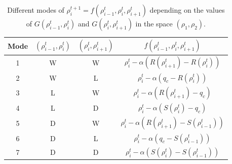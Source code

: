 \begin{table}[here]
\centering %
\begin{tabular}{c c c c} %
\hline\hline %
Mode & $(\rho^{t}_{i-1}, \rho^{t}_{i})$ & $(\rho^{t}_{i}, \rho^{t}_{i+1})$ & $f(\rho^{t}_{i-1},\rho^{t}_{i},\rho^{t}_{i+1})$ \\ [0.5ex]%
\hline %
1 & W & W & $\rho^{t}_{i} - \alpha(R(\rho^{t}_{i+1})-R(\rho^{t}_{i}))$ \\ [1ex]
2 & W & L & $\rho^{t}_{i} - \alpha(q_{c}-R(\rho^{t}_{i}))$ \\ [1ex]
3 & L & W & $\rho^{t}_{i} - \alpha(R(\rho^{t}_{i+1})-q_{c})$ \\ [1ex]
4 & L & D & $\rho^{t}_{i} - \alpha(S(\rho^{t}_{i})-q_{c})$ \\ [1ex]
5 & D & W & $\rho^{t}_{i} - \alpha(R(\rho^{t}_{i+1})-S(\rho^{t}_{i-1}))$ \\ [1ex]
6 & D & L & $\rho^{t}_{i} - \alpha(q_{c}-S(\rho^{t}_{i-1}))$ \\ [1ex]
7 & D & D & $\rho^{t}_{i} - \alpha(S(\rho^{t}_{i})-S(\rho^{t}_{i-1}))$ \\ [1ex]%
\hline %
\end{tabular}
\caption{Different modes of $\rho^{t+1}_{i} = f(\rho^{t}_{i-1},\rho^{t}_{i},\rho^{t}_{i+1})$ depending on the values of $G(\rho^{t}_{i-1},\rho^{t}_{i})$ and $G(\rho^{t}_{i},\rho^{t}_{i+1})$ in the space $(\rho_{1},\rho_{2})$.}
\label{table:modes} %
\end{table}

